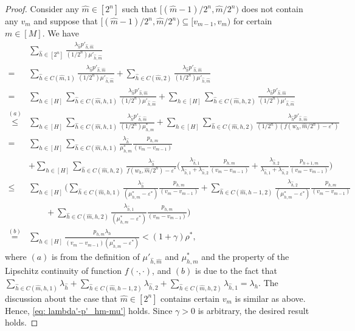 \documentclass[11pt, reqno]{article}
\numberwithin{equation}{section}
\numberwithin{theorem}{section}
\begin{document}
\begin{proof}
Consider any $\hat{m}\in[2^n]$ such that $[(\hat{m}-1)/2^n,\hat{m}/2^n)$ does not contain any $v_m$ and suppose that $[(\hat{m}-1)/2^n,\hat{m}/2^n)\subseteq[v_{m-1},v_m)$ for certain $m\in[M]$. We have 
\allowdisplaybreaks
\begin{align*}
    &\sum_{\hat{h}\in[2^n]}\frac{\lambda_{\hat{h}}p'_{\hat{h},\hat{m}}}{(1/2^n)\mu'_{\hat{h},\hat{m}}}\\
        =&\sum_{\hat{h}\in C(\hat{m},1)}\frac{\lambda_{\hat{h}} p'_{\hat{h},\hat{m}}}{(1/2^n)\mu'_{\hat{h},\hat{m}}}+\sum_{\hat{h}\in C(\hat{m},2)}\frac{\lambda_{\hat{h}} p'_{\hat{h},\hat{m}}}{(1/2^n)\mu'_{\hat{h},\hat{m}}}\\
        =& \sum_{h\in[H]}\sum_{\hat{h}\in C(\hat{m},h,1)}\frac{\lambda_{\hat{h}} p'_{\hat{h},\hat{m}}}{(1/2^n)\mu'_{\hat{h},\hat{m}}}+\sum_{h\in[H]}\sum_{\hat{h}\in C(\hat{m},h,2)}\frac{\lambda_{\hat{h}} p'_{\hat{h},\hat{m}}}{(1/2^n)\mu'_{\hat{h},\hat{m}}}\\
        \overset{(a)}{\leq}& \sum_{h\in[H]}\sum_{\hat{h}\in C(\hat{m},h,1)}\frac{\lambda_{\hat{h}} p'_{\hat{h},\hat{m}}}{(1/2^n)\mu^*_{h,m}}+\sum_{h\in[H]}\sum_{\hat{h}\in C(\hat{m},h,2)}\frac{\lambda_{\hat{h}} p'_{\hat{h},\hat{m}}}{(1/2^n)(f(w_h,\hat{m}/2^n)-\varepsilon^*)}\\
        =&\sum_{h\in[H]}\sum_{\hat{h}\in C(\hat{m},h,1)}\frac{\lambda_{\hat{h}}}{\mu^*_{h,m}}\frac{p_{h,m}}{(v_m-v_{m-1})}\\
        &+\sum_{h\in[H]}\sum_{\hat{h}\in C(\hat{m},h,2)}\frac{\lambda_{\hat{h}}}{f(w_h,\hat{m}/2^n)-\varepsilon^*}\Big(\frac{\lambda_{\hat{h},1}}{\lambda_{\hat{h},1}+\lambda_{\hat{h},2}}\frac{p_{h,m}}{(v_m-v_{m-1})}+\frac{\lambda_{\hat{h},2}}{\lambda_{\hat{h},1}+\lambda_{\hat{h},2}}\frac{p_{h+1,m}}{(v_m-v_{m-1})}\Big)\\
        \leq &\sum_{h\in[H]}\Big(\sum_{\hat{h}\in C(\hat{m},h,1)}\frac{\lambda_{\hat{h}}}{(\mu^*_{h,m}-\varepsilon^*)}\frac{p_{h,m}}{(v_m-v_{m-1})}+\sum_{\hat{h}\in C(\hat{m},h-1,2)}\frac{\lambda_{\hat{h},2}}{(\mu^*_{h,m}-\varepsilon^*)}\frac{p_{h,m}}{(v_m-v_{m-1})}\\
        &\quad \quad +\sum_{\hat{h}\in C(\hat{m},h,2)}\frac{\lambda_{\hat{h},1}}{(\mu^*_{h,m}-\varepsilon^*)}\frac{p_{h,m}}{(v_m-v_{m-1})}\Big)\\
        \overset{(b)}{=} & \sum_{h\in[H]}\frac{p_{h,m}\lambda_h}{(v_m-v_{m-1})(\mu^*_{h,m}-\varepsilon^*)}< (1+\gamma)\rho^*,
\end{align*}
where $(a)$ is from the definition of $\mu'_{\hat{h},\hat{m}}$ and $\mu^*_{h,m}$ and the property of the Lipschitz continuity of function $f(\cdot,\cdot)$, and $(b)$ is due to the fact that $ \sum_{\hat{h}\in C(\hat{m},h,1)}\lambda_{\hat{h}}+\sum_{\hat{h}\in C(\hat{m},h-1,2)}\lambda_{\hat{h},2}+\sum_{\hat{h}\in C(\hat{m},h,2)}\lambda_{\hat{h},1}=\lambda_h$.
The discussion about the case that $\hat{m}\in[2^n]$ contains certain $v_m$ is similar as above. Hence, \eqref{eq: lambda'-p'_hm-mu'} holds. Since $\gamma>0$ is arbitrary, the desired result holds.

\end{proof}
\end{document}
